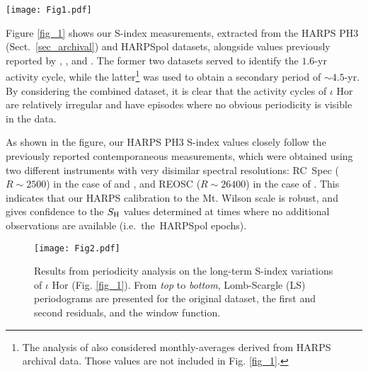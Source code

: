 \documentclass[a4paper,fleqn,usenatbib]{mnras}
\begin{document}
\begin{figure*}
\texttt{[image: Fig1.pdf]}
\caption{Long-term evolution of the chromospheric Ca H\,\&\,K S-Index of $\iota$ Hor.}\label{fig_1}
\end{figure*}

\noindent Figure \ref{fig_1} shows our S-index measurements, extracted from the HARPS PH3 (Sect.~\ref{sec_archival}) and HARPSpol datasets, alongside values previously reported by , , and . The former two datasets served to identify the $1.6$-yr activity cycle, while the latter\footnote[8]{The analysis of  also considered monthly-averages derived from HARPS archival data. Those values are not included in Fig. \ref{fig_1}.} was used to obtain a secondary period of $\sim$$4.5$-yr. By considering the combined dataset, it is clear that the activity cycles of $\iota$ Hor are relatively irregular and have episodes where no obvious periodicity is visible in the data.

As shown in the figure, our HARPS PH3 S-index values closely follow the previously reported contemporaneous measurements, which were obtained using two different instruments with very disimilar spectral resolutions: RC~Spec ($R \sim 2500$) in the case of  and , and REOSC ($R \sim 26400$) in the case of . This indicates that our HARPS calibration to the Mt. Wilson scale is robust, and gives confidence to the $S_{\rm H}$ values determined at times where no additional observations are available (i.e.~the~HARPSpol epochs). 
 

\begin{figure} %
\texttt{[image: Fig2.pdf]}
\caption{Results from periodicity analysis on the long-term S-index variations of $\iota$ Hor (Fig. \ref{fig_1}). From \textit{top} to \textit{bottom}, Lomb-Scargle (LS) periodograms are presented for the original dataset, the first and second residuals, and the window function.}\label{fig_2}
\end{figure}
\end{document}
